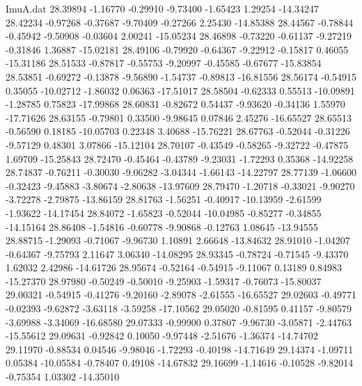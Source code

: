 \begin{filecontents}{ImuA.dat}
  28.39894   -1.16770   -0.29910   -9.73400   -1.65423    1.29254  -14.34247
  28.42234   -0.97268   -0.37687   -9.70409   -0.27266    2.25430  -14.85388
  28.44567   -0.78844   -0.45942   -9.50908   -0.03604    2.00241  -15.05234
  28.46898   -0.73220   -0.61137   -9.27219   -0.31846    1.36887  -15.02181
  28.49106   -0.79920   -0.64367   -9.22912   -0.15817    0.46055  -15.31186
  28.51533   -0.87817   -0.55753   -9.20997   -0.45585   -0.67677  -15.83854
  28.53851   -0.69272   -0.13878   -9.56890   -1.54737   -0.89813  -16.81556
  28.56174   -0.54915    0.35055  -10.02712   -1.86032    0.06363  -17.51017
  28.58504   -0.62333    0.55513  -10.09891   -1.28785    0.75823  -17.99868
  28.60831   -0.82672    0.54437   -9.93620   -0.34136    1.55970  -17.71626
  28.63155   -0.79801    0.33500   -9.98645    0.07846    2.45276  -16.65527
  28.65513   -0.56590    0.18185  -10.05703    0.22348    3.40688  -15.76221
  28.67763   -0.52044   -0.31226   -9.57129    0.48301    3.07866  -15.12104
  28.70107   -0.43549   -0.58265   -9.32722   -0.47875    1.69709  -15.25843
  28.72470   -0.45464   -0.43789   -9.23031   -1.72293    0.35368  -14.92258
  28.74837   -0.76211   -0.30030   -9.06282   -3.04344   -1.66143  -14.22797
  28.77139   -1.06600   -0.32423   -9.45883   -3.80674   -2.80638  -13.97609
  28.79470   -1.20718   -0.33021   -9.90270   -3.72278   -2.79875  -13.86159
  28.81763   -1.56251   -0.40917  -10.13959   -2.61599   -1.93622  -14.17454
  28.84072   -1.65823   -0.52044  -10.04985   -0.85277   -0.34855  -14.15164
  28.86408   -1.54816   -0.60778   -9.90868   -0.12763    1.08645  -13.94555
  28.88715   -1.29093   -0.71067   -9.96730    1.10891    2.66648  -13.84632
  28.91010   -1.04207   -0.64367   -9.75793    2.11647    3.06340  -14.08295
  28.93345   -0.78724   -0.71545   -9.43370    1.62032    2.42986  -14.61726
  28.95674   -0.52164   -0.54915   -9.11067    0.13189    0.84983  -15.27370
  28.97980   -0.50249   -0.50010   -9.25903   -1.59317   -0.76073  -15.80037
  29.00321   -0.54915   -0.41276   -9.20160   -2.89078   -2.61555  -16.65527
  29.02603   -0.49771   -0.02393   -9.62872   -3.63118   -3.59258  -17.10562
  29.05020   -0.81595    0.41157   -9.80579   -3.69988   -3.34069  -16.68580
  29.07333   -0.99900    0.37807   -9.96730   -3.05871   -2.44763  -15.55612
  29.09631   -0.92842    0.10050   -9.97448   -2.51676   -1.36374  -14.74702
  29.11970   -0.88534    0.04546   -9.98046   -1.72293   -0.40198  -14.71649
  29.14374   -1.09711    0.05384  -10.05584   -0.78407    0.49108  -14.67832
  29.16699   -1.14616   -0.10528   -9.82014   -0.75354    1.03302  -14.35010

\end{filecontents}
